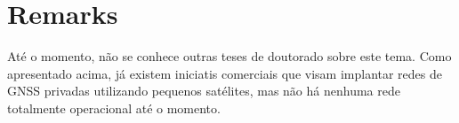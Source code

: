 \section{Remarks}

Até o momento, não se conhece outras teses de doutorado sobre este tema. Como apresentado acima, já existem iniciatis comerciais que visam implantar redes de GNSS privadas utilizando pequenos satélites, mas não há nenhuma rede totalmente operacional até o momento.
